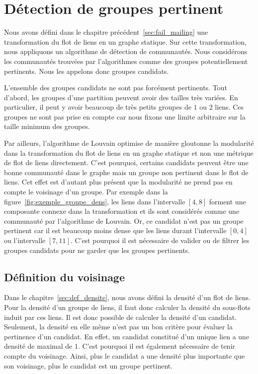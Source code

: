 \section{Détection de groupes pertinent}
\label{sec:groupe_dense_method}

Nous avons défini dans le chapitre précédent~\ref{sec:fail_mailing} une transformation du flot de liens en un graphe statique.
Sur cette transformation, nous appliquons un algorithme de détection de communautés.
Nous considérons les communautés trouvées par l'algorithmes comme des groupes potentiellement pertinents.
Nous les appelons donc groupes candidats.

L'ensemble des groupes candidats ne sont pas forcément pertinents.
Tout d'abord, les groupes d'une partition peuvent avoir des tailles très variées.
En particulier, il peut y avoir beaucoup de très petits groupes de $1$ ou $2$ liens.
Ces groupes ne sont pas prise en compte car nous fixons une limite arbitraire sur la taille minimum des groupes.

Par ailleurs, l'algorithme de Louvain optimise de manière gloutonne la modularité dans la transformation du flot de liens en un graphe statique et non une métrique de flot de liens directement.
C'est pourquoi, certains candidats peuvent être une bonne communauté dans le graphe mais un groupe non pertinent dans le flot de liens.
Cet effet est d'autant plus présent que la modularité ne prend pas en compte le voisinage d'un groupe.
Par exemple dans la figure~\ref{fig:exemple_groupe_dens}, les liens dans l'intervalle $[4,8]$ forment une composante connexe dans la transformation et ils sont considérés comme une communauté par l'algorithme de Louvain.
Or, ce candidat n'est pas un groupe pertinent car il est beaucoup moins dense que les liens durant l'intervalle $[0,4]$ ou l'intervalle $[7,11]$.
C'est pourquoi il est nécessaire de valider ou de filtrer les groupes candidats pour ne garder que les groupes pertinents.




\subsection{Définition du voisinage}
Dans le chapitre~\ref{sec:def_densite}, nous avons défini la densité d'un flot de liens.
Pour la densité d'un groupe de liens, il faut donc calculer la densité du sous-flots induit par ces liens.
Il est donc possible de calculer la densité d'un candidat.
Seulement, la densité en elle même n'est pas un bon critère pour évaluer la pertinence d'un candidat.
En effet, un candidat constitué d'un unique lien a une densité de maximal de $1$.
C'est pourquoi il est également nécessaire de tenir compte du voisinage.
Ainsi, plus le candidat a une densité plus importante que son voisinage, plus le candidat est un groupe pertinent.

